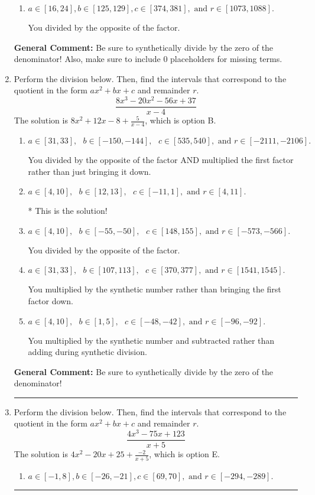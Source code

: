 \documentclass{extbook}[14pt]
\newcommand{\litem}[1]{\item #1

\rule{\textwidth}{0.4pt}}
\begin{document}
\begin{enumerate}
{\begin{enumerate}[label=\Alph*.]
 You multipled by the synthetic number rather than bringing the first factor down.
\item \( a \in [16, 24], b \in [125, 129], c \in [374, 381], \text{ and } r \in [1073, 1088]. \)

 You divided by the opposite of the factor.
\end{enumerate}

\textbf{General Comment:} Be sure to synthetically divide by the zero of the denominator! Also, make sure to include 0 placeholders for missing terms.
}
\litem{
Perform the division below. Then, find the intervals that correspond to the quotient in the form $ax^2+bx+c$ and remainder $r$.
\[ \frac{8x^{3} -20 x^{2} -56 x + 37}{x -4} \]The solution is \( 8x^{2} +12 x -8 + \frac{5}{x -4} \), which is option B.\begin{enumerate}[label=\Alph*.]
\item \( a \in [31, 33], \text{   } b \in [-150, -144], \text{   } c \in [535, 540], \text{   and   } r \in [-2111, -2106]. \)

 You divided by the opposite of the factor AND multiplied the first factor rather than just bringing it down.
\item \( a \in [4, 10], \text{   } b \in [12, 13], \text{   } c \in [-11, 1], \text{   and   } r \in [4, 11]. \)

* This is the solution!
\item \( a \in [4, 10], \text{   } b \in [-55, -50], \text{   } c \in [148, 155], \text{   and   } r \in [-573, -566]. \)

 You divided by the opposite of the factor.
\item \( a \in [31, 33], \text{   } b \in [107, 113], \text{   } c \in [370, 377], \text{   and   } r \in [1541, 1545]. \)

 You multiplied by the synthetic number rather than bringing the first factor down.
\item \( a \in [4, 10], \text{   } b \in [1, 5], \text{   } c \in [-48, -42], \text{   and   } r \in [-96, -92]. \)

 You multiplied by the synthetic number and subtracted rather than adding during synthetic division.
\end{enumerate}

\textbf{General Comment:} Be sure to synthetically divide by the zero of the denominator!
}
\litem{
Perform the division below. Then, find the intervals that correspond to the quotient in the form $ax^2+bx+c$ and remainder $r$.
\[ \frac{4x^{3} -75 x + 123}{x + 5} \]The solution is \( 4x^{2} -20 x + 25 + \frac{-2}{x + 5} \), which is option E.\begin{enumerate}[label=\Alph*.]
\item \( a \in [-1, 8], b \in [-26, -21], c \in [69, 70], \text{ and } r \in [-294, -289]. \)


\end{enumerate}}
\end{enumerate}
\end{document}
